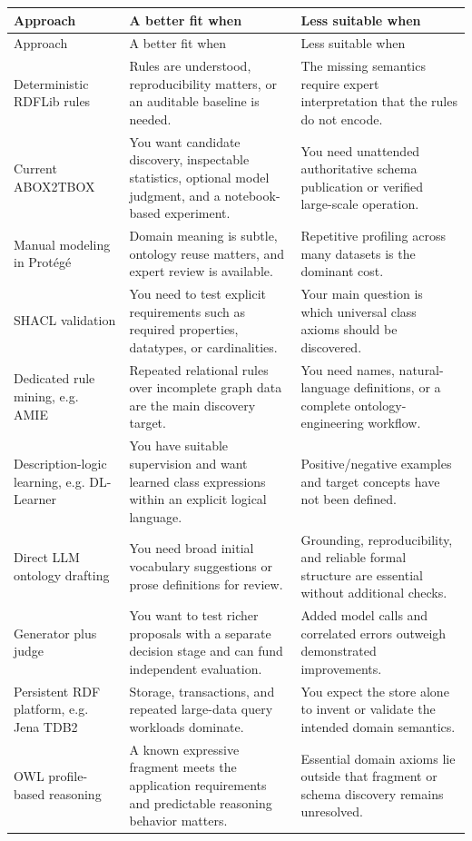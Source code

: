 \documentclass[11pt,a4paper]{article}
\begin{document}
\begin{longtable}{@{}P{34mm}P{60mm}P{60mm}@{}}
\toprule
Approach & A better fit when & Less suitable when \\
\midrule
\endfirsthead
\toprule Approach & A better fit when & Less suitable when \\ \midrule
\endhead
Deterministic RDFLib rules & Rules are understood, reproducibility matters, or an auditable baseline is needed. & The missing semantics require expert interpretation that the rules do not encode. \\
Current ABOX2TBOX & You want candidate discovery, inspectable statistics, optional model judgment, and a notebook-based experiment. & You need unattended authoritative schema publication or verified large-scale operation. \\
Manual modeling in Prot\'eg\'e & Domain meaning is subtle, ontology reuse matters, and expert review is available. & Repetitive profiling across many datasets is the dominant cost. \\
SHACL validation & You need to test explicit requirements such as required properties, datatypes, or cardinalities. & Your main question is which universal class axioms should be discovered. \\
Dedicated rule mining, e.g. AMIE & Repeated relational rules over incomplete graph data are the main discovery target. & You need names, natural-language definitions, or a complete ontology-engineering workflow. \\
Description-logic learning, e.g. DL-Learner & You have suitable supervision and want learned class expressions within an explicit logical language. & Positive/negative examples and target concepts have not been defined. \\
Direct LLM ontology drafting & You need broad initial vocabulary suggestions or prose definitions for review. & Grounding, reproducibility, and reliable formal structure are essential without additional checks. \\
Generator plus judge & You want to test richer proposals with a separate decision stage and can fund independent evaluation. & Added model calls and correlated errors outweigh demonstrated improvements. \\
Persistent RDF platform, e.g. Jena TDB2 & Storage, transactions, and repeated large-data query workloads dominate. & You expect the store alone to invent or validate the intended domain semantics. \\
OWL profile-based reasoning & A known expressive fragment meets the application requirements and predictable reasoning behavior matters. & Essential domain axioms lie outside that fragment or schema discovery remains unresolved. \\
\bottomrule
\end{longtable}
\end{document}
